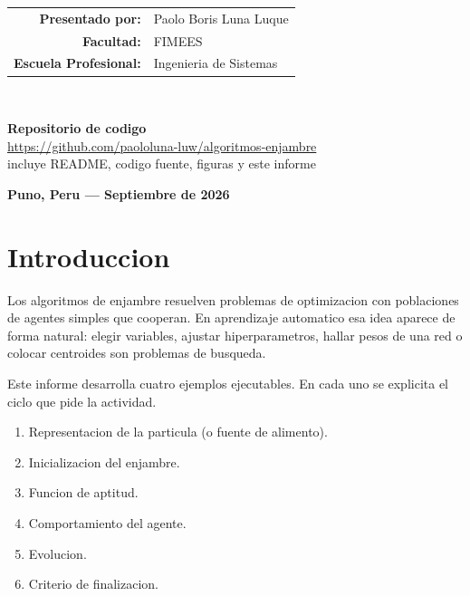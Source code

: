 \documentclass[11pt,oneside]{article}
\begin{document}
\begin{titlepage}
\begin{center}
\begin{tabular}{@{}rl@{}}
\textbf{\color{primnavy}Presentado por:} & Paolo Boris Luna Luque \\[3pt]
\textbf{\color{primnavy}Facultad:} & FIMEES \\[3pt]
\textbf{\color{primnavy}Escuela Profesional:} & Ingenieria de Sistemas \\
\end{tabular}\\[0.7cm]
\begin{tcolorbox}[colback=softgray,colframe=deepteal,boxrule=0.5pt,arc=2pt,left=10pt,right=10pt,top=7pt,bottom=7pt,width=0.88\textwidth]
\centering
{\small\bfseries\color{deepteal} Repositorio de codigo}\\[2pt]
\url{https://github.com/paololuna-luw/algoritmos-enjambre}\\[2pt]
{\scriptsize\color{midgray}incluye README, codigo fuente, figuras y este informe}
\end{tcolorbox}
\vfill
{\bfseries\color{primnavy} Puno, Peru --- Septiembre de 2026}
\end{center}
\end{titlepage}

\tableofcontents
\newpage

\section{Introduccion}
Los algoritmos de enjambre resuelven problemas de optimizacion con poblaciones de agentes simples que cooperan. En aprendizaje automatico esa idea aparece de forma natural: elegir variables, ajustar hiperparametros, hallar pesos de una red o colocar centroides son problemas de busqueda.

Este informe desarrolla cuatro ejemplos ejecutables. En cada uno se explicita el ciclo que pide la actividad.

\begin{cajadef}
\begin{enumerate}[leftmargin=1.4em,itemsep=2pt]
  \item Representacion de la particula (o fuente de alimento).
  \item Inicializacion del enjambre.
  \item Funcion de aptitud.
  \item Comportamiento del agente.
  \item Evolucion.
  \item Criterio de finalizacion.
\end{enumerate}
\end{cajadef}
\end{document}

